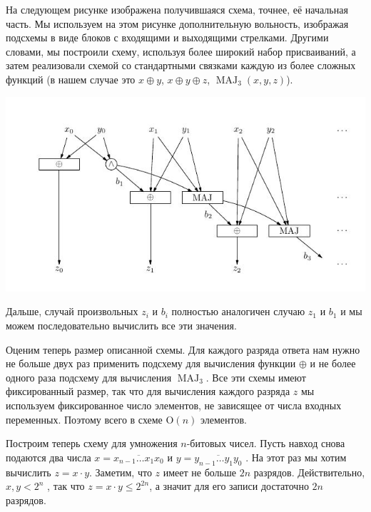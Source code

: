 \documentclass[a4paper]{article}
\theoremstyle{named}
\renewcommand{\O}{\text{O}}
\DeclareMathOperator{\MAJ}{\mathrm{MAJ}}
\begin{document}
\begin{colloq}
        На следующем рисунке изображена получившаяся схема, точнее, её начальная часть. Мы используем на этом рисунке дополнительную вольность, изображая подсхемы в виде блоков с входящими и выходящими стрелками. Другими словами, мы построили схему, используя более широкий набор присваиваний, а затем реализовали схемой со стандартными связками каждую из более сложных функций (в нашем случае это $x \oplus y$, $x \oplus y \oplus z$, $\MAJ_3(x, y, z)$).

        \begin{center}
            \includegraphics[]{img/schema}
        \end{center}

        Дальше, случай произвольных $z_i$ и $b_i$ полностью аналогичен случаю $z_1$ и $b_1$ и мы можем последовательно вычислить все эти значения.

        Оценим теперь размер описанной схемы. Для каждого разряда ответа нам нужно не больше двух раз применить подсхему для вычисления функции $\oplus$ и не более одного раза подсхему для вычисления $\MAJ_3$. Все эти схемы имеют фиксированный размер, так что для вычисления каждого разряда $z$ мы используем фиксированное число элементов, не зависящее от числа входных переменных. Поэтому всего в схеме $\O(n)$ элементов.

        \begin{problem*}
            Построим теперь схему для умножения $n$-битовых чисел. Пусть навход снова подаются два числа $x = \overline{x_{n - 1} \dots x_1 x_0}$ и $y = \overline{y_{n - 1} \dots y_1 y_0}$ . На этот раз мы хотим вычислить $z = x \cdot y$. Заметим, что $z$ имеет не больше $2n$ разрядов. Действительно, $x, y < 2^n$ , так что $z = x \cdot y \leq 2^{2n}$, а значит для его записи достаточно $2n$ разрядов.
        \end{problem*}


\end{colloq}
\end{document}
